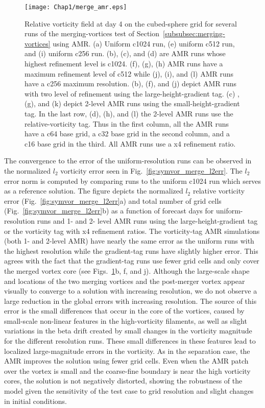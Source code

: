 \begin{figure}
    \centerline{%
    \noindent
    \texttt{[image: Chap1/merge\_amr.eps]}}
    \caption{Relative vorticity field at day 4 on the cubed-sphere grid
    for several runs of the merging-vortices test of
Section~\ref{subsubsec:merging-vortices}
using AMR.  (a) Uniform c1024 run, (e) uniform c512 run, and (i) uniform
    c256 run.  (b), (c), and (d) are AMR runs whose highest refinement
    level is c1024.  (f), (g), (h) AMR runs have a maximum refinement
    level of c512 while (j), (i), and (l) AMR runs have a c256 maximum
    resolution.  (b), (f), and (j) depict AMR runs with two level of
    refinement using the large-height-gradient tag.  (c) , (g), and (k)
    depict 2-level AMR runs using the small-height-gradient tag.  In the
    last row, (d), (h), and (l) the 2-level AMR runs use the
    relative-vorticity tag.  Thus in the first column, all the AMR runs have a
    c64 base grid, a c32 base grid in the second column, and a c16 base
    grid in the third.  All AMR runs use a x4 refinement ratio.}%
    \label{fig:merge_amr_comp}
\end{figure}
%
The convergence to
the error of the uniform-resolution runs can be observed in the normalized $l_2$
vorticity error seen in Fig.~\ref{fig:symvor_merge_l2err}. 
The $l_2$ error norm is computed by
comparing runs to the uniform c1024 run which serves as a reference solution. 
The figure depicts the normalized $l_2$ relative vorticity error 
(Fig.~\ref{fig:symvor_merge_l2err}a) and total number of grid cells 
(Fig.~\ref{fig:symvor_merge_l2err}b) as a function of forecast days for uniform-resolution runs and
1- and 2- level AMR runs using the large-height-gradient tag or the
vorticity tag with x4 refinement ratios. The vorticity-tag AMR
simulations (both 1- and 2-level AMR) have nearly the same error as the
uniform runs with the highest resolution while the gradient-tag runs
have slightly higher error.  This agrees with the fact that the
gradient-tag runs use fewer grid cells and only cover the merged vortex
core (see 
Figs.~\ref{fig:merge_amr_comp}b, f, and j).
Although the large-scale shape and
locations of the two merging vortices and the post-merger vortex appear
visually to converge to a solution with increasing resolution, we do not
observe a large reduction in the global errors with increasing
resolution.  The source of this error is the small differences that
occur in the core of the vortices, caused by small-scale non-linear features
in the high-vorticity filaments, as well as slight variations in the beta
drift created by small changes in the vorticity magnitude for the
different resolution runs.  These small differences in these features
lead to localized large-magnitude errors in the vorticity.  As in the
separation case, the AMR improves the solution using fewer grid cells.
Even when the AMR patch over the vortex is small and the coarse-fine
boundary is near the high vorticity cores, the solution is not
negatively distorted, showing the robustness of the model given the
sensitivity of the test case to grid resolution and slight changes in
initial conditions.

